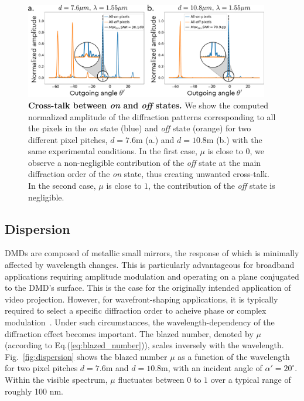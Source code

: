 \documentclass[12pt]{iopart}
\begin{document}
\begin{figure}
  \centering
  \includegraphics[width = 0.95\textwidth]{images/xtalk.pdf}
  \caption{
    \textbf{Cross-talk between {\em on} and {\em off} states.}
    We show the computed normalized amplitude of the diffraction patterns corresponding
    to all the pixels in the {\em on} state (blue)
    and {\em off} state (orange)
    for two different pixel pitches,
    $d = 7.6$\textmu m (a.)
    and $d = 10.8$\textmu m (b.)
    with the same experimental conditions.
    In the first case, $\mu$ is close to $0$,
    we observe a non-negligible contribution of the {\em off} state
    at the main diffraction order of the {\em on} state,
    thus creating unwanted cross-talk.
    In the second case, $\mu$ is close to $1$,
    the contribution of the {\em off} state is negligible.
  }
  \label{fig:xtalk}
\end{figure}

\subsection{Dispersion}


DMDs are composed of metallic small mirrors,
the response of which is minimally affected by wavelength changes.
This is particularly advantageous for broadband applications requiring amplitude modulation
and operating on a plane conjugated to the DMD's surface.
This is the case for the originally intended application of video projection.
However, for wavefront-shaping applications,
it is typically required to select a specific diffraction order
to acheive phase or complex modulation~\cite{lee1979binary,Gutierrez2024DMD}.
Under such circumstances,
the wavelength-dependency of the diffraction effect becomes important.
The blazed number, denoted by $\mu$ (according to Eq.(\ref{eq:blazed_number})),
scales inversely with the wavelength.
Fig.~\ref{fig:dispersion} shows the blazed number $\mu$
as a function of the wavelength for two pixel pitches $d=7.6$\textmu m and $d=10.8$\textmu m,
with an incident angle of $\alpha' = 20^\circ$.
Within the visible spectrum, $\mu$ fluctuates between $0$ to $1$ over a typical range of roughly 100 nm.\\
\end{document}
